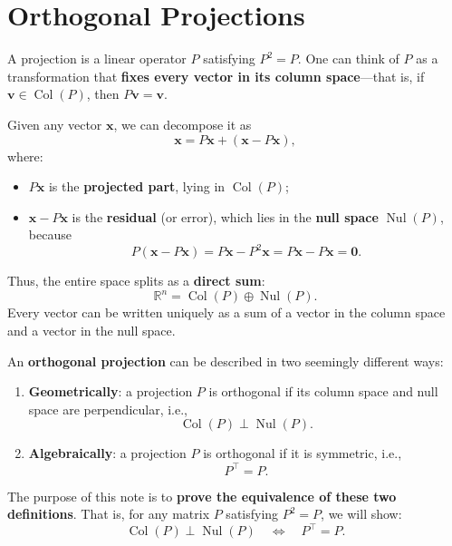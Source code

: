 
\Large


\chapter{Orthogonal Projections}

A projection is a linear operator \( P \) satisfying \( P^2 = P \). One can think of \( P \) as a transformation that \textbf{fixes every vector in its column space}—that is, if \( \mathbf{v} \in \operatorname{Col}(P) \), then \( P\mathbf{v} = \mathbf{v} \). 

Given any vector \( \mathbf{x} \), we can decompose it as  
\[
\mathbf{x} = P\mathbf{x} + (\mathbf{x} - P\mathbf{x}),
\]  
where:
\begin{itemize}
\item \( P\mathbf{x} \) is the \textbf{projected part}, lying in \( \operatorname{Col}(P) \);
    \item \( \mathbf{x} - P\mathbf{x} \) is the \textbf{residual} (or error), which lies in the \textbf{null space} \( \operatorname{Nul}(P) \), because 
    \[
    P(\mathbf{x} - P\mathbf{x}) = P\mathbf{x} - P^2\mathbf{x} = P\mathbf{x} - P\mathbf{x} = \mathbf{0}.
    \]
\end{itemize}
Thus, the entire space splits as a \textbf{direct sum}:  
\[
\mathbb{R}^n = \operatorname{Col}(P) \oplus \operatorname{Nul}(P).
\]  
Every vector can be written uniquely as a sum of a vector in the column space and a vector in the null space.

An \textbf{orthogonal projection} can be described in two seemingly different ways:

\begin{enumerate}
    \item \textbf{Geometrically}: a projection \( P \) is orthogonal if its column space and null space are perpendicular, i.e.,  
    \[
    \operatorname{Col}(P) \perp \operatorname{Nul}(P).
    \]

    \item \textbf{Algebraically}: a projection \( P \) is orthogonal if it is symmetric, i.e.,  
    \[
    P^\top = P.
    \]
\end{enumerate}


The purpose of this note is to \textbf{prove the equivalence of these two definitions}. That is, for any matrix \( P \) satisfying \( P^2 = P \), we will show:
\[
\operatorname{Col}(P) \perp \operatorname{Nul}(P) \quad \Longleftrightarrow \quad P^\top = P.
\]






